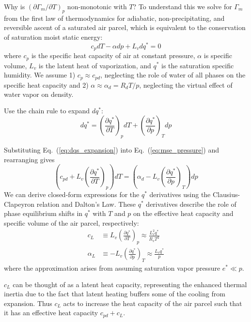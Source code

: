 \documentclass[draft]{ametsocV6.1}
\begin{document}
Why is $(\partial\Gamma_m/\partial T)_p$ non-monotonic with $T$? To understand this we solve for $\Gamma_m$ from the first law of thermodynamics for adiabatic, non-precipitating, and reversible ascent of a saturated air parcel, which is equivalent to the conservation of saturation moist static energy:
\begin{equation}
c_{p} dT - \alpha dp + L_v dq^* = 0 \label{eq:mse_pressure}
\end{equation}
where $c_{p}$ is the specific heat capacity of air at constant pressure, $\alpha$ is specific volume, $L_v$ is the latent heat of vaporization, and $q^*$ is the saturation specific humidity. We assume 1) $c_p \approx c_{pd}$, neglecting the role of water of all phases on the specific heat capacity and 2) $\alpha \approx \alpha_d = R_d T/p$, neglecting the virtual effect of water vapor on density. 

Use the chain rule to expand $dq^*$:
\begin{equation}
dq^* = \left(\frac{\partial q^*}{\partial T}\right)_p dT + \left(\frac{\partial q^*}{\partial p}\right)_T dp \label{eq:dqs_expansion}
\end{equation}

Substituting Eq.~(\ref{eq:dqs_expansion}) into Eq.~(\ref{eq:mse_pressure}) and rearranging gives
\begin{equation}
\left(c_{pd} + L_v\left(\frac{\partial q^*}{\partial T}\right)_p \right)dT = \left(\alpha_d - L_v\left(\frac{\partial q^*}{\partial p}\right)_T\right)dp \label{eq:rearranged}
\end{equation}
We can derive closed-form expressions for the $q^*$ derivatives using the Clausius-Clapeyron relation and Dalton's Law. These $q^*$ derivatives describe the role of phase equilibrium shifts in $q^*$ with $T$ and $p$ on the effective heat capacity and specific volume of the air parcel, respectively:
\begin{align}
c_L &\equiv L_v\left(\frac{\partial q^*}{\partial T}\right)_p \approx \frac{L_v^2 q^*}{R_v T^2}
\label{eq:c_L} \\
\alpha_L &\equiv -L_v\left(\frac{\partial q^*}{\partial p}\right)_T \approx \frac{L_v q^*}{p}
\label{eq:alpha_L}
\end{align}
where the approximation arises from assuming saturation vapor pressure $e^* \ll p$.

$c_L$ can be thought of as a latent heat capacity, representing the enhanced thermal inertia due to the fact that latent heating buffers some of the cooling from expansion. Thus $c_L$ acts to increase the heat capacity of the air parcel such that it has an effective heat capacity $c_{pd} + c_L$.
\end{document}
